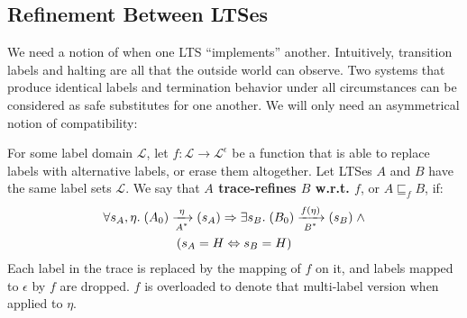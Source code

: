 
\subsection{Refinement Between LTSes}

We need a notion of when one LTS ``implements'' another.  Intuitively,
transition labels and halting are all that the outside world
can observe. Two systems that produce identical labels and termination behavior
under all circumstances can be considered as safe substitutes for
one another. We will only need an asymmetrical notion of compatibility:

\begin{defn}\label{refines}
For some label domain $\mathcal L$, let $f : \mathcal L \to \mathcal L^\epsilon$ 
be a function that is able to replace labels with alternative
labels, or erase them altogether. Let LTSes $A$ and $B$ have the same label
sets $\mathcal L$. We say that
\textbf{$A$ trace-refines $B$ w.r.t. $f$}, or $A \sqsubseteq_f B$, if:
\begin{multline*}
\forall s_A, \eta. \; \io{$A^{*}$}{A_0}{s_A}{\eta} \Rightarrow \exists s_B. \;
\io{$B^{*}$}{B_0}{s_B}{f(\eta)} \; \wedge \\
(s_A = H \Leftrightarrow s_B = H)
\end{multline*}
Each label in the trace is replaced by the mapping of $f$ on it, and
labels mapped to $\epsilon$ by $f$ are dropped. $f$ is overloaded
to denote that multi-label version when applied to $\eta$.
\end{defn}

